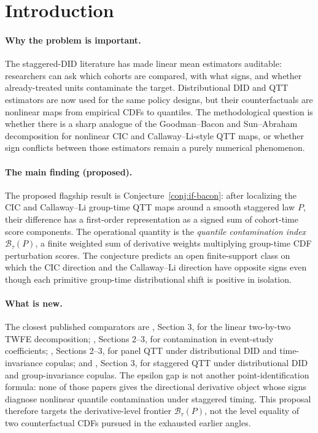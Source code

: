 \documentclass[11pt]{article}
\theoremstyle{definition}
\theoremstyle{plain}
\theoremstyle{remark}
\begin{document}
\section{Introduction}
\paragraph{Why the problem is important.}
The staggered-DID literature has made linear mean estimators auditable: researchers can ask which cohorts are compared, with what signs, and whether already-treated units contaminate the target.  Distributional DID and QTT estimators are now used for the same policy designs, but their counterfactuals are nonlinear maps from empirical CDFs to quantiles.  The methodological question is whether there is a sharp analogue of the Goodman--Bacon and Sun--Abraham decomposition for nonlinear CIC and Callaway--Li-style QTT maps, or whether sign conflicts between those estimators remain a purely numerical phenomenon.

\paragraph{The main finding (proposed).}
The proposed flagship result is Conjecture~\ref{conj:if-bacon}: after localizing the CIC and Callaway--Li group-time QTT maps around a smooth staggered law \(P\), their difference has a first-order representation as a signed sum of cohort-time score components.  The operational quantity is the \emph{quantile contamination index} \(\mathcal B_\tau(P)\), a finite weighted sum of derivative weights multiplying group-time CDF perturbation scores.  The conjecture predicts an open finite-support class on which the CIC direction and the Callaway--Li direction have opposite signs even though each primitive group-time distributional shift is positive in isolation.

\paragraph{What is new.}
The closest published comparators are \citet{GoodmanBacon2021}, Section 3, for the linear two-by-two TWFE decomposition; \citet{SunAbraham2021}, Sections 2--3, for contamination in event-study coefficients; \citet{CallawayLi2019}, Sections 2--3, for panel QTT under distributional DID and time-invariance copulas; and \citet{LiLin2024}, Section 3, for staggered QTT under distributional DID and group-invariance copulas.  The epsilon gap is not another point-identification formula: none of those papers gives the directional derivative object whose signs diagnose nonlinear quantile contamination under staggered timing.  This proposal therefore targets the derivative-level frontier \(\mathcal B_\tau(P)\), not the level equality of two counterfactual CDFs pursued in the exhausted earlier angles.
\end{document}
